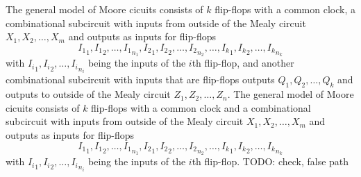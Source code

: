 \documentclass[a4paper,12pt]{report}
\begin{document}
The general model of Moore cicuits consists of $k$ flip-flops with a common clock, a combinational subcircuit with inputs from outside of the Mealy circuit $X_1,X_2,\ldots,X_m$ and outputs as inputs for flip-flops
\[{I_1}_1,{I_1}_2,\ldots,{I_1}_{n_1},{I_2}_1,{I_2}_2,\ldots,{I_2}_{n_2},\ldots,{I_k}_1,{I_k}_2,\ldots,{I_k}_{n_k}\]
with ${I_i}_1,{I_i}_2,\ldots,{I_i}_{n_i}$ being the inputs of the $i$th flip-flop, and another combinational subcircuit with inputs that are flip-flops outputs $Q_1,Q_2,\ldots,Q_k$ and outputs to outside of the Mealy circuit $Z_1,Z_2,\ldots,Z_n$.
The general model of Moore cicuits consists of $k$ flip-flops with a common clock and a combinational subcircuit with inputs from outside of the Mealy circuit $X_1,X_2,\ldots,X_m$ and outputs as inputs for flip-flops
\[{I_1}_1,{I_1}_2,\ldots,{I_1}_{n_1},{I_2}_1,{I_2}_2,\ldots,{I_2}_{n_2},\ldots,{I_k}_1,{I_k}_2,\ldots,{I_k}_{n_k}\]
with ${I_i}_1,{I_i}_2,\ldots,{I_i}_{n_i}$ being the inputs of the $i$th flip-flop.
TODO: check, false path
\end{document}
